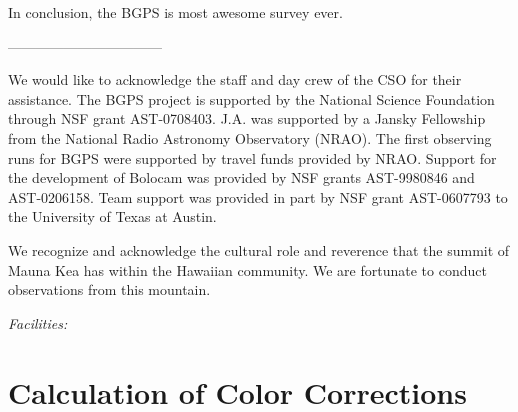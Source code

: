 \documentclass[12pt,preprint]{aastex}
\begin{document}
In conclusion, the BGPS is most awesome survey ever.

\noindent---------------------------------

\acknowledgments

We would like to acknowledge the staff and day crew of the CSO for their
assistance. The BGPS project is supported by the National Science Foundation
through NSF grant AST-0708403. J.A. was supported by a Jansky Fellowship from
the National Radio Astronomy Observatory (NRAO). The first observing runs for
BGPS were supported by travel funds provided by NRAO. Support for the
development of Bolocam was provided by NSF grants AST-9980846 and AST-0206158.
Team support was provided in part by NSF grant AST-0607793 to the
University of Texas at Austin.

We recognize and acknowledge the cultural role and reverence that the
summit of Mauna Kea has within the Hawaiian community. We are
fortunate to conduct observations from this mountain.

{\it Facilities:} 

\appendix

\section{Calculation of Color Corrections}
\label{app:ColorCorrections}
\end{document}
